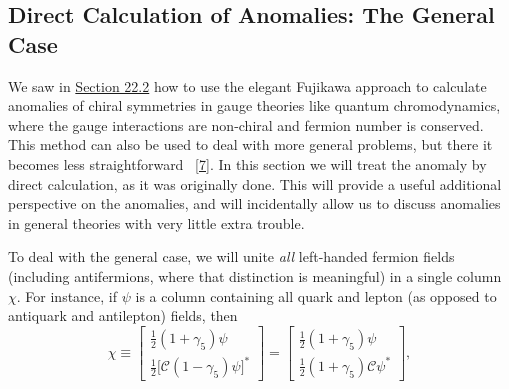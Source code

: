 \subsection{Direct Calculation of Anomalies: The General Case}
\label{sec:22.3}

We saw in \hyperref[sec:22.2]{Section 22.2} how to use the elegant Fujikawa
approach to calculate anomalies of chiral symmetries in gauge theories like
quantum chromodynamics, where the gauge interactions are non-chiral and
fermion number is conserved. This method can also be used to deal with more
general problems, but there it becomes less straightforward~%
\hyperref[ch22-ref-7]{[7]}. In this section we will treat the anomaly by
direct calculation, as it was originally done. This will provide a useful
additional perspective on the anomalies, and will incidentally allow us to
discuss anomalies in general theories with very little extra trouble.

To deal with the general case, we will unite \emph{all} left-handed fermion
fields (including antifermions, where that distinction is meaningful) in a
single column $\chi$. For instance, if $\psi$ is a column containing all
quark and lepton (as opposed to antiquark and antilepton) fields, then
\begin{equation}
 \chi\equiv
 \begin{bmatrix}
  \tfrac12(1+\gamma_5)\psi\\[2pt]
  \tfrac12\bigl[\mathcal C(1-\gamma_5)\psi\bigr]^*
 \end{bmatrix}
 =
 \begin{bmatrix}
  \tfrac12(1+\gamma_5)\psi\\[2pt]
  \tfrac12(1+\gamma_5)\mathcal C\psi^*
 \end{bmatrix},
 \tag{22.3.1}\label{eq:22.3.1}
\end{equation}

